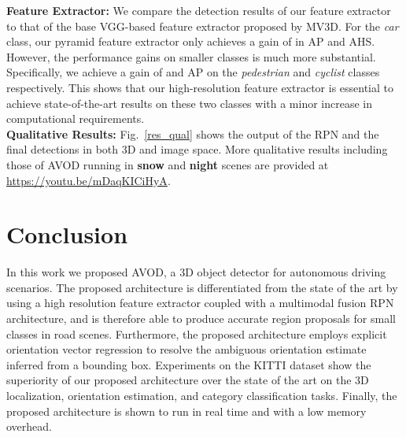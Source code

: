 \documentclass[letterpaper, 10 pt, conference]{ieeeconf}
\newcommand{\fig}[1]{Fig.~\ref{#1}}
\begin{document}
\noindent \textbf{Feature Extractor:}
We compare the detection results of our feature extractor to that of the base VGG-based feature extractor proposed by MV3D. For the \textit{car} class, our pyramid feature extractor only achieves a gain of  in AP and AHS. However, the performance gains on smaller classes is much more substantial. Specifically, we achieve a gain of  and  AP on the \textit{pedestrian} and \textit{cyclist} classes respectively. This shows that our high-resolution feature extractor is essential to achieve state-of-the-art results on these two classes with a minor increase in computational requirements.\\ 

\noindent\textbf{Qualitative Results:} \fig{res_qual} shows the output of the RPN and the final detections in both 3D and image space. More qualitative results including those of AVOD running in \textbf{snow} and \textbf{night} scenes are provided at \href{https://youtu.be/mDaqKICiHyA}{https://youtu.be/mDaqKICiHyA}. 


\section{Conclusion}
In this work we proposed AVOD, a 3D object detector for autonomous driving scenarios. The proposed architecture is differentiated from the state of the art by using a high resolution feature extractor coupled with a multimodal fusion RPN architecture, and is therefore able to produce accurate region proposals for small classes in road scenes. Furthermore, the proposed architecture employs explicit orientation vector regression to resolve the ambiguous orientation estimate inferred from a bounding box. Experiments on the KITTI dataset show the superiority of our proposed architecture over the state of the art on the 3D localization, orientation estimation, and category classification tasks. Finally, the proposed architecture is shown to run in real time and with a low memory overhead.


\end{document}
